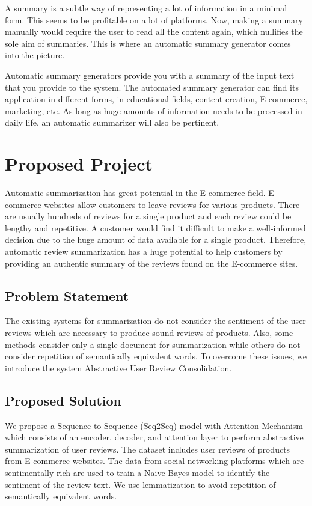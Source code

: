 \documentclass[11pt]{report}
\begin{document}
A summary is a subtle way of representing a lot of information in a minimal form. This seems to be profitable on a lot of platforms. Now, making a summary manually would require the user to read all the content again, which nullifies the sole aim of summaries. This is where an automatic summary generator comes into the picture.

Automatic summary generators provide you with a summary of the input text that you provide to the system. The automated summary generator can find its application in different forms, in educational fields, content creation, E-commerce, marketing, etc. As long as huge amounts of information needs to be processed in daily life, an automatic summarizer will also be pertinent.

\section{Proposed Project}
Automatic summarization has great potential in the E-commerce field. E-commerce websites allow customers to leave reviews for various products. There are usually hundreds of reviews for a single product and each review could be lengthy and repetitive. A customer would find it difficult to make a well-informed decision due to the huge amount of data available for a single product. Therefore, automatic review summarization has a huge potential to help customers by providing an authentic summary of the reviews found on the E-commerce sites.
\subsection{Problem Statement}
The existing systems for summarization do not consider the sentiment of the user reviews which are necessary to produce sound reviews of products. Also, some methods consider only a single document for summarization while others do not consider repetition of semantically equivalent words. To overcome these issues, we introduce the system Abstractive User Review Consolidation.

\subsection{Proposed Solution}
We propose a Sequence to Sequence (Seq2Seq) model with Attention Mechanism which consists of an encoder, decoder, and attention layer to perform abstractive summarization of user reviews. The dataset includes user reviews of products from E-commerce websites. The data from social networking platforms which are sentimentally rich are used to train a Naive Bayes model to identify the sentiment of the review text. We use lemmatization to avoid repetition of semantically equivalent words.
\end{document}
